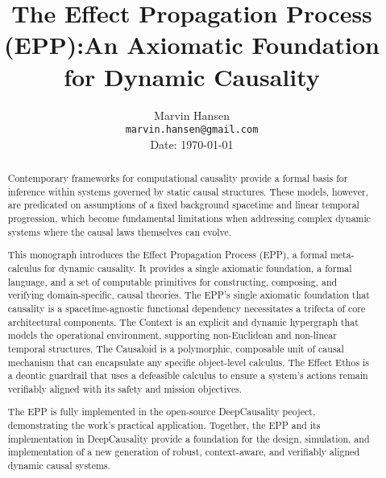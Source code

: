\documentclass{article}
\title{The Effect Propagation Process (EPP):\newline An Axiomatic Foundation for Dynamic Causality}
\author{
  Marvin Hansen \\
  \texttt{marvin.hansen@gmail.com} \\
   Date: \today
}
\begin{document}
\maketitle

\begin{abstract}
Contemporary frameworks for computational causality provide a formal basis for inference within systems governed by static causal structures. These models, however, are predicated on assumptions of a fixed background spacetime and linear temporal progression, which become fundamental limitations when addressing complex dynamic systems where the causal laws themselves can evolve.

This monograph introduces the Effect Propagation Process (EPP), a formal meta-calculus for dynamic causality. It provides a single axiomatic foundation, a formal language, and a set of computable primitives for constructing, composing, and verifying domain-specific, causal theories. The EPP's single axiomatic foundation that causality is a spacetime-agnostic functional dependency necessitates a trifecta of core architectural components. The Context is an explicit and dynamic hypergraph that models the operational environment, supporting non-Euclidean and non-linear temporal structures. The Causaloid is a polymorphic, composable unit of causal mechanism that can encapsulate any specific object-level calculus. The Effect Ethos is a  deontic guardrail that uses a defeasible calculus to ensure a system's actions remain verifiably aligned with its safety and mission objectives.

The EPP is fully implemented in the open-source DeepCausality peoject, demonstrating the work's practical application. Together, the EPP and its implementation in DeepCausality provide a foundation for the design, simulation, and implementation of a new generation of robust, context-aware, and verifiably aligned dynamic causal systems.

\end{abstract}

\newpage

\tableofcontents

\newpage








\end{document}
